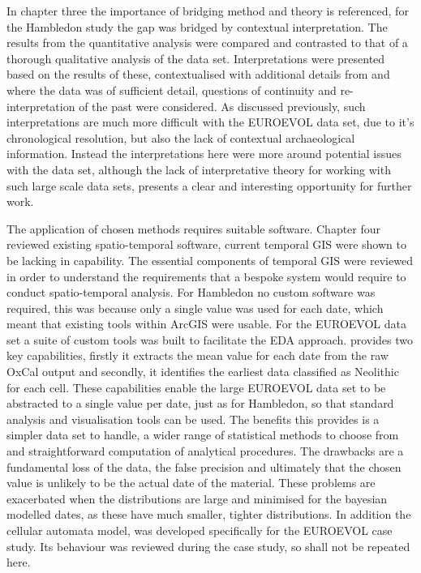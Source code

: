 In chapter three the importance of bridging method and theory is referenced, for the Hambledon study the gap was bridged by contextual interpretation. The results from the quantitative analysis were compared and contrasted to that of a thorough qualitative analysis of the data set. Interpretations were presented based on the results of these, contextualised with additional details from \citet{Mercer:2008fk} and where the data was of sufficient detail, questions of continuity and re-interpretation of the past were considered. As discussed previously, such interpretations are much more difficult with the EUROEVOL data set, due to it's chronological resolution, but also the lack of contextual archaeological information. Instead the interpretations here were more around potential issues with the data set, although the lack of interpretative theory for working with such large scale data sets, presents a clear and interesting opportunity for further work.

The application of chosen methods requires suitable software. Chapter four reviewed existing spatio-temporal software, current temporal GIS were shown to be lacking in capability. The essential components of temporal GIS were reviewed in order to understand the requirements that a bespoke system would require to conduct spatio-temporal analysis. For Hambledon no custom software was required, this was because only a single value was used for each date, which meant that existing tools within ArcGIS were usable. For the EUROEVOL data set a suite of custom tools was built to facilitate the EDA approach. \citet{doug_cowie_2018_1297321} provides two key capabilities, firstly it extracts the mean value for each date from the raw OxCal output and secondly, it identifies the earliest data classified as Neolithic for each cell. These capabilities enable the large EUROEVOL data set to be abstracted to a single value per date, just as for Hambledon, so that standard analysis and visualisation tools can be used. The benefits this provides is a simpler data set to handle, a wider range of statistical methods to choose from and straightforward computation of analytical procedures. The drawbacks are a fundamental loss of the data, the false precision and ultimately that the chosen value is unlikely to be the actual date of the material. These problems are exacerbated when the distributions are large and minimised for the bayesian modelled dates, as these have much smaller, tighter distributions. In addition the cellular automata model, \citet{doug_cowie_2018_1297319} was developed specifically for the EUROEVOL case study. Its behaviour was reviewed during the case study, so shall not be repeated here.

